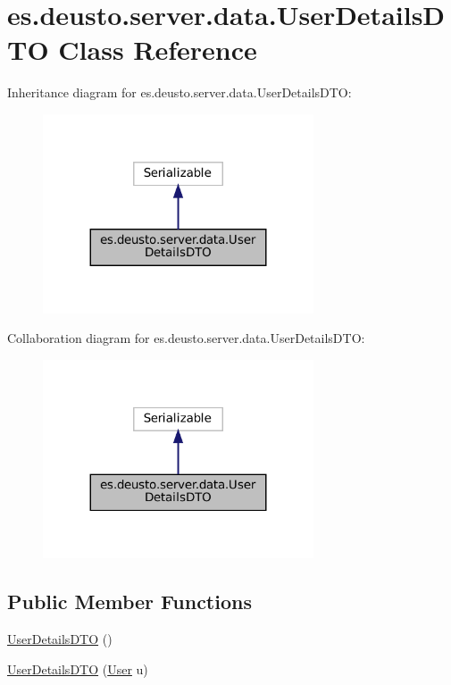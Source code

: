 \hypertarget{classes_1_1deusto_1_1server_1_1data_1_1_user_details_d_t_o}{}\section{es.\+deusto.\+server.\+data.\+User\+Details\+D\+TO Class Reference}
\label{classes_1_1deusto_1_1server_1_1data_1_1_user_details_d_t_o}


Inheritance diagram for es.\+deusto.\+server.\+data.\+User\+Details\+D\+TO\+:
\nopagebreak
\begin{figure}[H]
\begin{center}
\leavevmode
\includegraphics[width=227pt]{classes_1_1deusto_1_1server_1_1data_1_1_user_details_d_t_o__inherit__graph}
\end{center}
\end{figure}


Collaboration diagram for es.\+deusto.\+server.\+data.\+User\+Details\+D\+TO\+:
\nopagebreak
\begin{figure}[H]
\begin{center}
\leavevmode
\includegraphics[width=227pt]{classes_1_1deusto_1_1server_1_1data_1_1_user_details_d_t_o__coll__graph}
\end{center}
\end{figure}
\subsection*{Public Member Functions}
\begin{DoxyCompactItemize}
\item 
\mbox{\hyperlink{classes_1_1deusto_1_1server_1_1data_1_1_user_details_d_t_o_ac079ed52a730b1c55f989bfd41f51ddb}{User\+Details\+D\+TO}} ()
\item 
\mbox{\hyperlink{classes_1_1deusto_1_1server_1_1data_1_1_user_details_d_t_o_aae05e33019f1da5126c95feda9f7d25a}{User\+Details\+D\+TO}} (\mbox{\hyperlink{classes_1_1deusto_1_1server_1_1jdo_1_1_user}{User}} u)
\end{DoxyCompactItemize}
